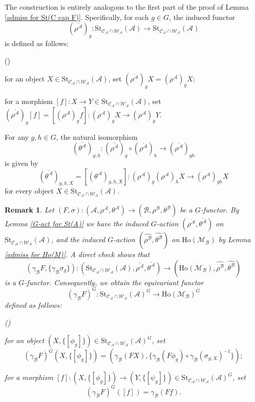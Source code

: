 \documentclass[12pt,twoside]{amsart}
\theoremstyle{bfupright head,slanted body}
\theoremstyle{bfupright head,upright body}
\theoremstyle{fixed bf head,slanted body}
\theoremstyle{fixed bf head,upright body}
\newtheorem{rmk}[res]{Remark}           \newtheorem*{rmk*}{Remark}
\theoremstyle{numbered paragraph}
\newlength{\thmlistleft}        %
\newlength{\thmlistright}       %
\newlength{\thmlistpartopsep}   %
\newlength{\thmlisttopsep}      %
\newlength{\thmlistparsep}      %
\newlength{\thmlistitemsep}     %
\newcounter{rqm}
\newenvironment{rqm}{\begin{list}{\upshape (\arabic{rqm})}%
    {\usecounter{rqm}%
      \setlength{\leftmargin}{\thmlistleft}%
      \setlength{\labelwidth}{\thmlistleft}%
      \setlength{\rightmargin}{\thmlistright}%
      \setlength{\partopsep}{\thmlistpartopsep}%
      \setlength{\topsep}{\thmlisttopsep}%
      \setlength{\parsep}{\thmlistparsep}%
      \setlength{\itemsep}{\thmlistitemsep}}}%
  {\end{list}}%
\newenvironment{prf*}[1][Proof]{%
  \begin{proof}[\bf #1]
    \setcounter{equation}{0}
    \renewcommand{\theequation}{\arabic{equation}}}
  {\end{proof}
}
\numberwithin{equation}{res}
\newcommand{\calC}{\mathcal{C}}
\newcommand{\calW}{\mathcal{W}}
\newcommand{\calA}{\mathcal{A}}
\newcommand{\calB}{\mathcal{B}}
\newcommand{\calM}{\mathcal{M}}
\newcommand{\Ho}{\mathrm{Ho}}
\newcommand{\St}{\mathrm{St}}
\begin{document}
\begin{prf*}
The construction is entirely analogous to the first part of the proof of Lemma \ref{admiss for St(C cap F)}. Specifically, for each \(g\in G\), the induced functor
\[
(\overline{\rho^\calA})_g : \St_{\calC_\calA \cap \calW_\calA}(\calA) \longrightarrow \St_{\calC_\calA \cap \calW_\calA}(\calA)
\]
is defined as follows:
\begin{rqm}
\item[$\bullet$]
for an object $X \in \St_{\calC_\calA \cap \calW_\calA}(\calA)$, set $(\overline{\rho^\calA})_g X = (\rho^\calA)_g X$;
\item[$\bullet$]
for a morphism $[f] : X \to Y \in \St_{\calC_\calA \cap \calW_\calA}(\calA)$, set $(\overline{\rho^\calA})_g[f] = [(\rho^\calA)_g f] : (\rho^\calA)_g X \to (\rho^\calA)_g Y$.
\end{rqm}
For any \(g,h\in G\), the natural isomorphism
\[
(\overline{\theta^\calA})_{g,h}:(\overline{\rho^\calA})_g\circ(\overline{\rho^\calA})_h \longrightarrow (\overline{\rho^\calA})_{gh}
\]
is given by
\[
(\overline{\theta^\calA})_{g,h,X} = [(\theta^\calA)_{g,h,X}] : (\rho^\calA)_g(\rho^\calA)_h X \longrightarrow (\rho^\calA)_{gh} X
\]
for every object \(X\in\St_{\calC_\calA\cap\calW_\calA}(\calA)\).
\end{prf*}

\begin{rmk} \label{gamma F is G}
Let \((F,\sigma):(\calA,\rho^\calA,\theta^\calA)\to(\calB,\rho^\calB,\theta^\calB)\) be a \(G\)-functor.
By Lemma \ref{G-act for St(A)} we have the induced \(G\)-action \((\overline{\rho^\calA},\overline{\theta^\calA})\) on \(\St_{\calC_\calA \cap \calW_\calA}(\calA)\), and the induced \(G\)-action \((\widehat{\rho^\calB},\widehat{\theta^\calB})\) on \(\Ho(\calM_\calB)\) by Lemma \ref{admiss for Ho(M)}. A direct check shows that
\[
(\gamma_{\calB}F,\{\gamma_{\calB}\sigma_g\}) :
(\St_{\calC_\calA \cap \calW_\calA}(\calA),\overline{\rho^\calA},\overline{\theta^\calA})
\longrightarrow
(\Ho(\calM_\calB),\widehat{\rho^\calB},\widehat{\theta^\calB})
\]
is a \(G\)-functor.
Consequently, we obtain the equivariant functor
\[
(\gamma_{\calB}F)^G :
\St_{\calC_\calA \cap \calW_\calA}(\calA)^G
\longrightarrow
\Ho(\calM_\calB)^G
\]
defined as follows:
\begin{rqm}
\item[$\bullet$]
for an object $(X, \{[\phi_g]\}) \in \St_{\calC_\calA \cap \calW_\calA}(\calA)^G$, set
\[
(\gamma_\calB F)^G(X, \{[\phi_g]\}) = (\gamma_\calB(FX), \{\gamma_\calB(F \phi_g) \circ \gamma_\calB(\sigma_{g, X})^{-1}\});
\]
\item[$\bullet$]
for a morphism $[f] : (X, \{[\phi_g]\}) \to (Y, \{[\psi_g]\}) \in
\St_{\calC_\calA \cap \calW_\calA}(\calA)^G$, set
\[(\gamma_\calB F)^G([f]) = \gamma_\calB(F f).\]
\end{rqm}
\end{rmk}
\end{document}
